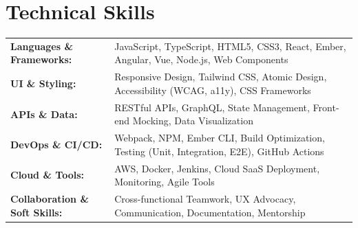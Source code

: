 \documentclass[letterpaper,11pt]{article}
\begin{document}
\section{Technical Skills}
        \vspace{-14pt}
        \begin{table}[h]
            \fontsize{9pt}{10pt}\selectfont
            \begin{tabular}{p{0.3\linewidth} p{0.7\linewidth}}
                \textbf{Languages \& Frameworks:} & JavaScript, TypeScript, HTML5, CSS3, React, Ember, Angular, Vue, Node.js, Web Components \\
                \textbf{UI \& Styling:} & Responsive Design, Tailwind CSS, Atomic Design, Accessibility (WCAG, a11y), CSS Frameworks \\
                \textbf{APIs \& Data:} & RESTful APIs, GraphQL, State Management, Front-end Mocking, Data Visualization \\
                \textbf{DevOps \& CI/CD:} & Webpack, NPM, Ember CLI, Build Optimization, Testing (Unit, Integration, E2E), GitHub Actions \\
                \textbf{Cloud \& Tools:} & AWS, Docker, Jenkins, Cloud SaaS Deployment, Monitoring, Agile Tools \\
                \textbf{Collaboration \& Soft Skills:} & Cross-functional Teamwork, UX Advocacy, Communication, Documentation, Mentorship \\
            \end{tabular}
        \end{table}
 \vspace{-15pt}
 
\end{document}
